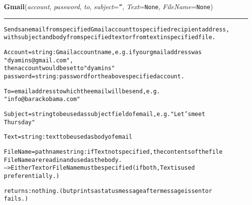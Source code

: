 \hspace{.8\funcindent}\begin{boxedminipage}{\funcwidth}

    \raggedright \textbf{Gmail}(\textit{account}, \textit{password}, \textit{to}, \textit{subject}={\tt ''}, \textit{Text}={\tt None}, \textit{FileName}={\tt None})

    \vspace{-1.5ex}

    \rule{\textwidth}{0.5\fboxrule}
\setlength{\parskip}{2ex}
\begin{alltt}

Sends an email from specified Gmail account to specified recipient address, 
with subject and body from specified text or from text in specified file.
 
Account = string :  Gmail account name, e.g. if your gmail address was 
"dyamins@gmail.com", 
        then account would be set to "dyamins"
password = string: password for the above specified account.

To = email address to which the email will be send, e.g. 
"info@barackobama.com"

Subject = string to be used as subject field of email, e.g. "Let's meet 
Thursday"

Text = string : text to be used as body of email 

FileName  = pathname string : if Text not specified, the contents of the file 
FileName are read in and used as the body.
--{\textgreater} Either Text or FileName must be specified (if both, Text is used 
preferentially.)

returns : nothing.  (but prints a status message after message is sent or 
fails.)
\end{alltt}

\setlength{\parskip}{1ex}
    \end{boxedminipage}

